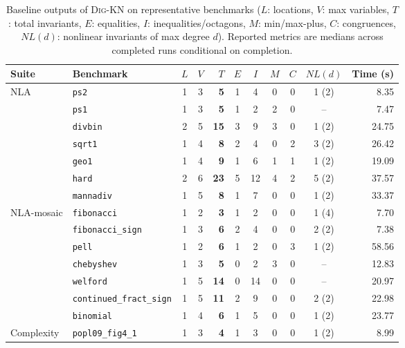 \documentclass[runningheads]{llncs}
\newcommand{\tool}{\textsc{Dig-KN}\xspace}
\newcommand{\code}[1]{\texttt{\small #1}}
\begin{document}
\begin{table}[h!]
\centering
\caption{Baseline outputs of \tool{} on representative benchmarks ($L$: locations, $V$: max variables, $T$: total invariants, $E$: equalities, $I$: inequalities/octagons, $M$: min/max-plus, $C$: congruences, $NL(d)$: nonlinear invariants of max degree $d$). Reported metrics are medians across completed runs conditional on completion.}
\label{tab:benchmarks_detail}
\small
\setlength{\tabcolsep}{3.5pt}
\begin{tabular}{llccrcccccr}
\toprule
Suite & Benchmark & $L$ & $V$ & $T$ & $E$ & $I$ & $M$ & $C$ & $NL(d)$ & Time (s) \\
\midrule
\multirow{7}{*}{NLA} 
& \code{ps2}             & 1 & 3 & \textbf{5}  & 1 & 4  & 0 & 0 & 1 (2) & 8.35 \\
& \code{ps1}             & 1 & 3 & \textbf{5}  & 1 & 2  & 2 & 0 & --    & 7.47 \\
& \code{divbin}          & 2 & 5 & \textbf{15} & 3 & 9  & 3 & 0 & 1 (2) & 24.75 \\
& \code{sqrt1}           & 1 & 4 & \textbf{8}  & 2 & 4  & 0 & 2 & 3 (2) & 26.42 \\
& \code{geo1}            & 1 & 4 & \textbf{9}  & 1 & 6  & 1 & 1 & 1 (2) & 19.09 \\
& \code{hard}            & 2 & 6 & \textbf{23} & 5 & 12 & 4 & 2 & 5 (2) & 37.57 \\
& \code{mannadiv}        & 1 & 5 & \textbf{8}  & 1 & 7  & 0 & 0 & 1 (2) & 33.37 \\
\midrule
\multirow{7}{*}{NLA-mosaic}
& \code{fibonacci}               & 1 & 2 & \textbf{3}  & 1 & 2  & 0 & 0 & 1 (4) & 7.70 \\
& \code{fibonacci\_sign}         & 1 & 3 & \textbf{6}  & 2 & 4  & 0 & 0 & 2 (2) & 7.38 \\
& \code{pell}                    & 1 & 2 & \textbf{6}  & 1 & 2  & 0 & 3 & 1 (2) & 58.56 \\
& \code{chebyshev}               & 1 & 3 & \textbf{5}  & 0 & 2  & 3 & 0 & --    & 12.83 \\
& \code{welford}                 & 1 & 5 & \textbf{14} & 0 & 14 & 0 & 0 & --    & 20.97 \\
& \code{continued\_fract\_sign}  & 1 & 5 & \textbf{11} & 2 & 9  & 0 & 0 & 2 (2) & 22.98 \\
& \code{binomial}                & 1 & 4 & \textbf{6}  & 1 & 5  & 0 & 0 & 1 (2) & 23.77 \\
\midrule
\multirow{6}{*}{Complexity}
& \code{popl09\_fig4\_1} & 1 & 3 & \textbf{4}  & 1 & 3  & 0 & 0 & 1 (2) & 8.99 \\

\end{tabular}
\end{table}
\end{document}

